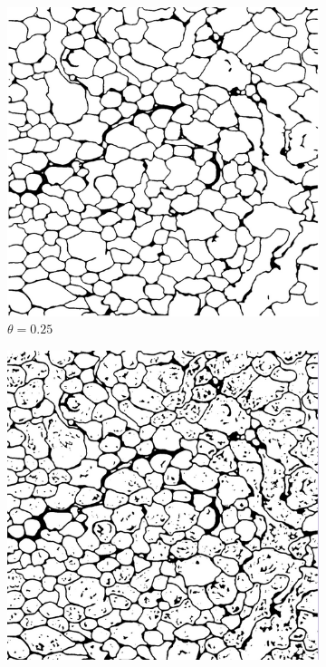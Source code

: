 \begin{figure}[!htbp]
    \centering
    \begin{subfigure}[t]{0.31\textwidth}
        \centering
        \includegraphics[height=0.9\textwidth]{./images/thresh_1.png}
		\caption{$\theta = 0.25$}
    \end{subfigure}%
    \begin{subfigure}[t]{0.31\textwidth}
        \centering
        \includegraphics[height=0.9\textwidth]{./images/thresh_2.png}

\end{subfigure}
\end{figure}
